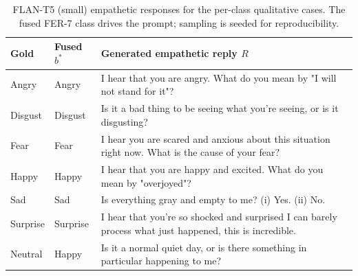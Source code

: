 \begin{table}[t]
  \small
  \centering
  \caption{FLAN-T5 (small) empathetic responses for the per-class qualitative cases. The fused FER-7 class drives the prompt; sampling is seeded for reproducibility.}
  \label{tab:qualresponses}
  \setlength{\tabcolsep}{4pt}
  \renewcommand{\arraystretch}{1.2}
  \begin{tabular}{@{}l l p{}@{}}
    \toprule
    \textbf{Gold} & \textbf{Fused $b^{*}$} & \textbf{Generated empathetic reply $R$} \\
    \midrule
    Angry & Angry & I hear that you are angry. What do you mean by "I will not stand for it"? \\
    Disgust & Disgust & Is it a bad thing to be seeing what you're seeing, or is it disgusting? \\
    Fear & Fear & I hear you are scared and anxious about this situation right now. What is the cause of your fear? \\
    Happy & Happy & I hear that you are happy and excited. What do you mean by "overjoyed"? \\
    Sad & Sad & Is everything gray and empty to me? (i) Yes. (ii) No. \\
    Surprise & Surprise & I hear that you're so shocked and surprised I can barely process what just happened, this is incredible. \\
    Neutral & Happy & Is it a normal quiet day, or is there something in particular happening to me? \\
    \bottomrule
  \end{tabular}
\end{table}
